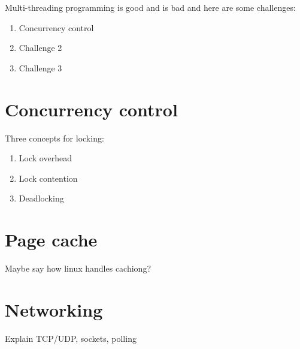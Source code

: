 
Multi-threading programming is good and is bad and here are some challenges:

\begin{enumerate}
	\item Concurrency control
	\item Challenge 2
	\item Challenge 3
\end{enumerate}

\section{Concurrency control}


Three concepts for locking:

\begin{enumerate}
	\item Lock overhead
	\item Lock contention
	\item Deadlocking
\end{enumerate}

\section{Page cache}

Maybe say how linux handles cachiong?

\section{Networking}

Explain TCP/UDP, sockets, polling
